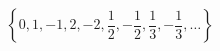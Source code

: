 \documentclass[nofonts]{ctexart}
\begin{document}
\[
	\left\{
		0,1,-1,2,-2,\frac{1}{2},-\frac{1}{2},\frac{1}{3},
		-\frac{1}{3},\dotsc
	\right\}
\]
\end{document}

